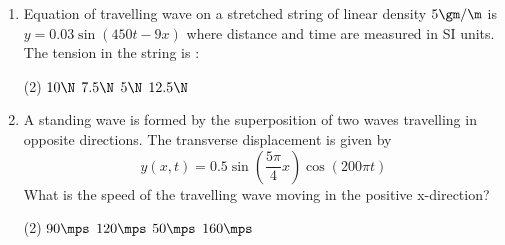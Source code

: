 \documentclass{article}
\renewcommand{\ans}{\quad}
\begin{document}
\begin{enumerate}
\item Equation of travelling wave on a stretched string of linear density $5 \gm/\m$ is $y = 0.03 \sin(450 t - 9x)$ where distance and time are measured in SI units. The tension in the string is : 
	\begin{tasks}(2)
		\task $10 \N$
		\task $7.5 \N$
		\task $5 \N$
		\task $12.5 \N$\ans
	\end{tasks}

\item A standing wave is formed by the superposition of two waves travelling in opposite directions. The transverse displacement is given by \[ y(x, t) = 0.5\sin\left(\dfrac{5\pi}{4}x\right)\cos\left(200\pi t\right) \] What is the speed of the travelling wave moving in the positive x-direction?
	\begin{tasks}(2)
		\task $90\mps$
		\task $120\mps$
		\task $50\mps$
		\task $160\mps$\ans
	\end{tasks}
\end{enumerate}

\pagebreak
\end{document}
